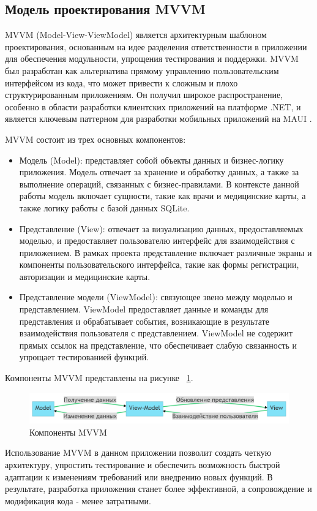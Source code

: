 \subsection{Модель проектирования MVVM}
MVVM (Model-View-ViewModel) является архитектурным шаблоном проектирования, основанным на идее разделения ответственности в приложении для обеспечения модульности, упрощения тестирования и поддержки. MVVM был разработан как альтернатива прямому управлению пользовательским интерфейсом из кода, что может привести к сложным и плохо структурированным приложениям. Он получил широкое распространение, особенно в области разработки клиентских приложений на платформе .NET, и является ключевым паттерном для разработки мобильных приложений на MAUI \cite{MVVM}. 

MVVM состоит из трех основных компонентов:
\begin{itemize}
\item Модель (Model): представляет собой объекты данных и бизнес-логику приложения. Модель отвечает за хранение и обработку данных, а также за выполнение операций, связанных с бизнес-правилами. В контексте данной работы модель включает сущности, такие как врачи и медицинские карты, а также логику работы с базой данных SQLite.

\item Представление (View): отвечает за визуализацию данных, предоставляемых моделью, и предоставляет пользователю интерфейс для взаимодействия с приложением. В рамках проекта представление включает различные экраны и компоненты пользовательского интерфейса, такие как формы регистрации, авторизации и медицинские карты.

\item Представление модели (ViewModel): связующее звено между моделью и представлением. ViewModel предоставляет данные и команды для представления и обрабатывает события, возникающие в результате взаимодействия пользователя с представлением. ViewModel не содержит прямых ссылок на представление, что обеспечивает слабую связанность и упрощает тестированией функций.
\end{itemize}

Компоненты MVVM представлены на рисунке ~\ref{fig:fig01}.

\begin{figure}
  \includegraphics[scale=0.5]{inc/mvvm_logic.png}
  \caption{Компоненты MVVM}
  \label{fig:fig01}
\end{figure}

Использование MVVM в данном приложении позволит создать четкую архитектуру, упростить тестирование и обеспечить возможность быстрой адаптации к изменениям требований или внедрению новых функций. В результате, разработка приложения станет более эффективной, а сопровождение и модификация кода - менее затратными.